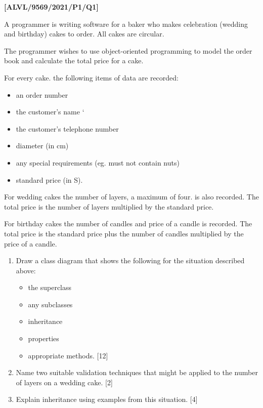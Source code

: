 \item \textbf{{[}ALVL/9569/2021/P1/Q1{]} }

A programmer is writing software for a baker who makes celebration
(wedding and birthday) cakes to order. All cakes are circular.

The programmer wishes to use object-oriented programming to model
the order book and calculate the total price for a cake. 

For every cake. the following items of data are recorded: 
\begin{itemize}
\item an order number 
\item the customer\textquoteright s name \textquoteleft{} 
\item the customer's telephone number 
\item diameter (in cm) 
\item any special requirements (eg. must not contain nuts) 
\item standard price (in S). 
\end{itemize}
For wedding cakes the number of layers, a maximum of four. is also
recorded. The total price is the number of layers multiplied by the
standard price. 

For birthday cakes the number of candles and price of a candle is
recorded. The total price is the standard price plus the number of
candles multiplied by the price of a candle. 
\begin{enumerate}
\item Draw a class diagram that shows the following for the situation described
above:
\begin{itemize}
\item the superclass
\item any subclasses
\item inheritance
\item properties
\item appropriate methods. \hfill{}{[}12{]}
\end{itemize}
\item Name two suitable validation techniques that might be applied to the
number of layers on a wedding cake.\hfill{} {[}2{]}
\item Explain inheritance using examples from this situation. \hfill{}{[}4{]}
\end{enumerate}